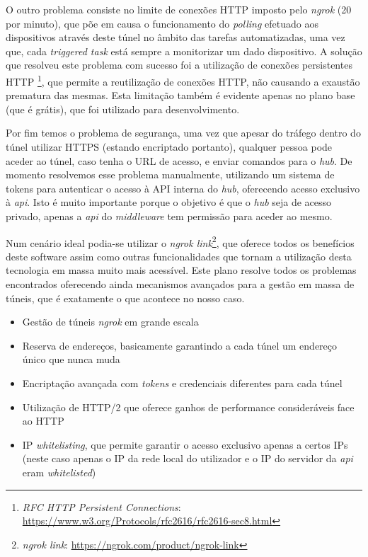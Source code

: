 O outro problema consiste no limite de conexões HTTP imposto pelo \textit{ngrok} (20 por minuto), que põe em causa o funcionamento do \textit{polling} efetuado aos dispositivos através deste túnel no âmbito das tarefas automatizadas, uma vez que, cada \textit{triggered task} está sempre a monitorizar um dado dispositivo. A solução que resolveu este problema com sucesso foi a utilização de conexões persistentes HTTP \footnote{\textit{RFC HTTP Persistent Connections}: \url{https://www.w3.org/Protocols/rfc2616/rfc2616-sec8.html}}, que permite a reutilização de conexões HTTP, não causando a exaustão prematura das mesmas. Esta limitação também é evidente apenas no plano base (que é grátis), que foi utilizado para desenvolvimento.

Por fim temos o problema de segurança, uma vez que apesar do tráfego dentro do túnel utilizar HTTPS (estando encriptado portanto), qualquer pessoa pode aceder ao túnel, caso tenha o URL de acesso, e enviar comandos para o \textit{hub}. De momento resolvemos esse problema manualmente, utilizando um sistema de tokens para autenticar o acesso à API interna do \textit{hub}, oferecendo acesso exclusivo à \textit{api}. Isto é muito importante porque o objetivo é que o \textit{hub} seja de acesso privado, apenas a \textit{api} do \textit{middleware} tem permissão para aceder ao mesmo.

Num cenário ideal podia-se utilizar o \textit{ngrok link}\footnote{\textit{ngrok link}: \url{https://ngrok.com/product/ngrok-link}}, que oferece todos os benefícios deste software assim como outras funcionalidades que tornam a utilização desta tecnologia em massa muito mais acessível. Este plano resolve todos os problemas encontrados oferecendo ainda mecanismos avançados para a gestão em massa de túneis, que é exatamente o que acontece no nosso caso.
\begin{itemize}
    \item Gestão de túneis \textit{ngrok} em grande escala
    \item Reserva de endereços, basicamente garantindo a cada túnel um endereço único que nunca muda
    \item Encriptação avançada com \textit{tokens} e credenciais diferentes para cada túnel
    \item Utilização de HTTP/2 que oferece ganhos de performance consideráveis face ao HTTP
    \item IP \textit{whitelisting}, que permite garantir o acesso exclusivo apenas a certos IPs (neste caso apenas o IP da rede local do utilizador e o IP do servidor da \textit{api} eram \textit{whitelisted})
\end{itemize}

